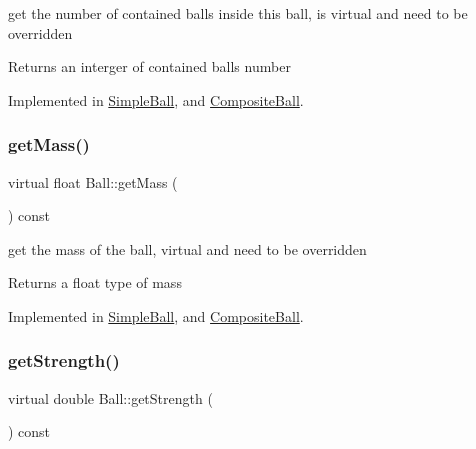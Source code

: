 get the number of contained balls inside this ball, is virtual and need to be overridden 

\begin{DoxyReturn}{Returns}
an interger of contained balls\textquotesingle{} number 
\end{DoxyReturn}


Implemented in \mbox{\hyperlink{class_simple_ball_ac9c7e389cf03bfb2f3e71d66bf6608cd}{Simple\+Ball}}, and \mbox{\hyperlink{class_composite_ball_a8120a00750a9bb77fd6e41f98de119b3}{Composite\+Ball}}.

\mbox{\label{class_ball_ab755ce741a2f0b652f499d183376be04}} 
\subsubsection{\texorpdfstring{get\+Mass()}{getMass()}}
{\footnotesize\ttfamily virtual float Ball\+::get\+Mass (\begin{DoxyParamCaption}{ }\end{DoxyParamCaption}) const\hspace{0.3cm}{\ttfamily [pure virtual]}}



get the mass of the ball, virtual and need to be overridden 

\begin{DoxyReturn}{Returns}
a float type of mass 
\end{DoxyReturn}


Implemented in \mbox{\hyperlink{class_simple_ball_a0cb0b931a2e3fa9f2ffba6fd354985ea}{Simple\+Ball}}, and \mbox{\hyperlink{class_composite_ball_afa621612641fecb3af81390bfbe7d941}{Composite\+Ball}}.

\mbox{\label{class_ball_ab659c8dceb67abdd09423814d4fc879e}} 
\subsubsection{\texorpdfstring{get\+Strength()}{getStrength()}}
{\footnotesize\ttfamily virtual double Ball\+::get\+Strength (\begin{DoxyParamCaption}{ }\end{DoxyParamCaption}) const\hspace{0.3cm}{\ttfamily [pure virtual]}}



